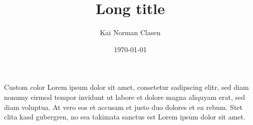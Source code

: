 \documentclass[aspectratio=169]{beamer}
\title[Custom color]{Long title}
\author{Kai Norman Clasen}
\institute{}
\date{\today}
\begin{document}
  \begin{frame}{Custom color}
    Lorem ipsum dolor sit amet, consetetur sadipscing elitr,
    sed diam nonumy eirmod tempor invidunt ut labore et dolore
    magna aliquyam erat, sed diam voluptua.
    At vero eos et accusam et justo duo dolores et ea rebum.
    Stet clita kasd gubergren, no sea takimata sanctus est
    Lorem ipsum dolor sit amet.
  \end{frame}
\end{document}
